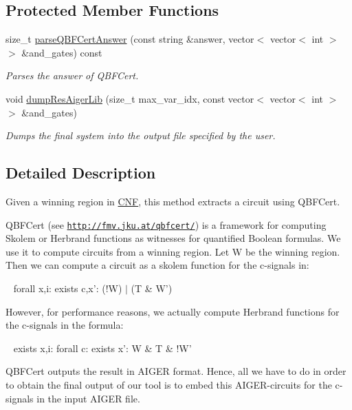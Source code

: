 \subsection*{Protected Member Functions}
\begin{DoxyCompactItemize}
\item 
size\-\_\-t \hyperlink{classQBFCertImplExtractor_a30f9aea9a9cb3b2662cb4eee1ac73687}{parse\-Q\-B\-F\-Cert\-Answer} (const string \&answer, vector$<$ vector$<$ int $>$ $>$ \&and\-\_\-gates) const 
\begin{DoxyCompactList}\small\item\em Parses the answer of Q\-B\-F\-Cert. \end{DoxyCompactList}\item 
void \hyperlink{classQBFCertImplExtractor_a86906e053e6a487037927c1e209ea473}{dump\-Res\-Aiger\-Lib} (size\-\_\-t max\-\_\-var\-\_\-idx, const vector$<$ vector$<$ int $>$ $>$ \&and\-\_\-gates)
\begin{DoxyCompactList}\small\item\em Dumps the final system into the output file specified by the user. \end{DoxyCompactList}\end{DoxyCompactItemize}


\subsection{Detailed Description}
Given a winning region in \hyperlink{classCNF}{C\-N\-F}, this method extracts a circuit using Q\-B\-F\-Cert. 

Q\-B\-F\-Cert (see \href{http://fmv.jku.at/qbfcert/}{\tt http\-://fmv.\-jku.\-at/qbfcert/}) is a framework for computing Skolem or Herbrand functions as witnesses for quantified Boolean formulas. We use it to compute circuits from a winning region. Let W be the winning region. Then we can compute a circuit as a skolem function for the c-\/signals in\-: \par
 ~ forall x,i\-: exists c,x'\-: (!\-W) $|$ (T \& W') \par
 However, for performance reasons, we actually compute Herbrand functions for the c-\/signals in the formula\-: \par
 ~ exists x,i\-: forall c\-: exists x'\-: W \& T \& !\-W' \par
 Q\-B\-F\-Cert outputs the result in A\-I\-G\-E\-R format. Hence, all we have to do in order to obtain the final output of our tool is to embed this A\-I\-G\-E\-R-\/circuits for the c-\/signals in the input A\-I\-G\-E\-R file.


